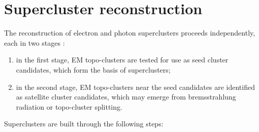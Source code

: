 \documentclass[a4paper, oneside]{book}
\begin{document}
			
		\section{Supercluster reconstruction}\label{section:super cl}
		The reconstruction of electron and photon superclusters proceeds independently, each in two stages \cite{El ph reco}:
		\begin{enumerate}
		\item in the first stage, EM topo-clusters are tested for use as seed cluster candidates, which form the basis of superclusters; 
		\item in the second stage, EM topo-clusters near the seed candidates are identified as satellite cluster candidates, which may emerge from bremsstrahlung radiation or topo-cluster splitting.
		\end{enumerate}
		Superclusters are built through the following steps:
\end{document}
